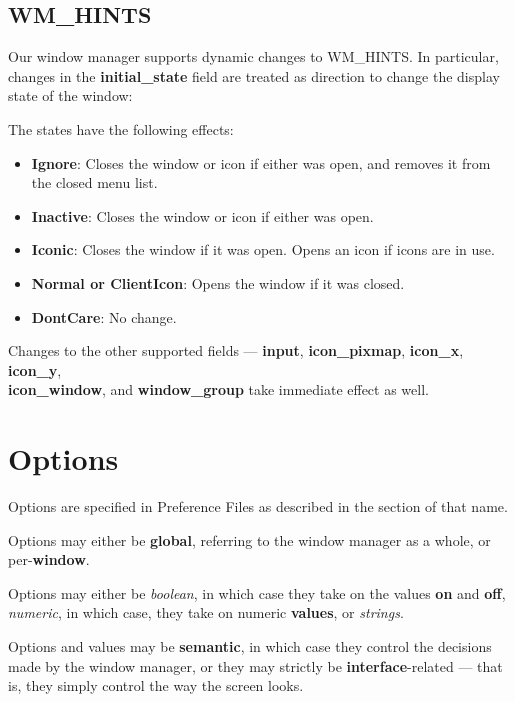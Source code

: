 \subsection{WM\_HINTS}

Our window manager supports dynamic changes to {\sc WM\_HINTS}.  In
particular, changes in the {\bf initial\_state} field are treated as
direction to change the display state of the window:

The states have the following effects:

\begin{itemize}
\item {\bf Ignore}: Closes the window or icon if either was open, and removes
it from the closed menu list.

\item {\bf Inactive}: Closes the window or icon if either was open.

\item {\bf Iconic}: Closes the window if it was open. Opens an icon if icons are
in use.

\item {\bf Normal or ClientIcon}: Opens the window if it was closed.

\item {\bf DontCare}: No change.
\end{itemize}

Changes to the other supported fields --- {\bf input}, {\bf icon\_pixmap},
{\bf icon\_x}, {\bf icon\_y}, \\ 
{\bf icon\_window}, and {\bf window\_group}
take immediate effect as well.

\section{Options}

Options are specified in Preference Files as described in the section of
that name.

Options may either be {\bf global}, referring to the window manager as
a whole, or per-{\bf window}.

Options may either be {\it boolean}, in which case they take on the values
{\bf on} and {\bf off}, {\it numeric}, in which case, they take on numeric
{\bf values}, or {\it strings}.

Options and values may be {\bf semantic}, in which case they control the
decisions made by the window manager, or they may strictly be
{\bf interface}-related --- that is, they simply control the way the screen
looks.


